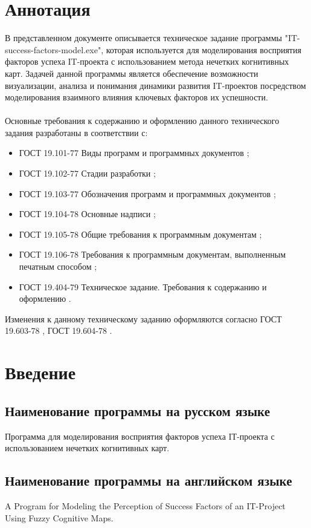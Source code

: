 \documentclass{article}
\begin{document}
    \section {Аннотация}
    В представленном документе описывается техническое задание программы "{}IT-success-factors-model.exe"{}, которая используется для моделирования восприятия факторов успеха IT-проекта с использованием метода нечетких когнитивных карт. Задачей данной программы является обеспечение возможности визуализации, анализа и понимания динамики развития IT-проектов посредством моделирования взаимного влияния ключевых факторов их успешности.\\
    ~\\
    Основные требования к содержанию и оформлению данного технического задания разработаны в соответствии с:
    \begin{itemize}
        \item ГОСТ 19.101-77 Виды программ и программных документов \cite{litlink1};
        \item ГОСТ 19.102-77 Стадии разработки \cite{litlink2};
        \item ГОСТ 19.103-77 Обозначения программ и программных документов \cite{litlink3};
        \item ГОСТ 19.104-78 Основные надписи \cite{litlink4};
        \item ГОСТ 19.105-78 Общие требования к программным документам \cite{litlink5};
        \item ГОСТ 19.106-78 Требования к программным документам, выполненным печатным
        способом \cite{litlink6};
        \item ГОСТ 19.404-79 Техническое задание. Требования к содержанию и оформлению \cite{litlink7}.
    \end{itemize}
    Изменения к данному техническому заданию оформляются согласно ГОСТ 19.603-78 \cite{litlink8}, ГОСТ 19.604-78 \cite{litlink9}.
    \newpage
    \section {Введение}
    \subsection {Наименование программы на русском языке}
    Программа для моделирования восприятия факторов успеха IТ-проекта с использованием нечетких когнитивных карт.
    \subsection {Наименование программы на английском языке}
    A Program for Modeling the Perception of Success Factors of an IT-Project Using Fuzzy Cognitive Maps.
\end{document}
